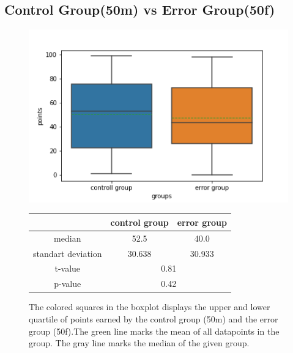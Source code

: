 \documentclass[runningheads]{llncs}
\begin{document}
\subsection{Control Group(50m) vs Error Group(50f)}
\begin{figure}
    \begin{minipage}{0.43\textwidth}        
        \includegraphics[width=\textwidth]{code/generate/all.png}
        \caption{The colored squares in the boxplot displays
        the upper and lower quartile of points earned by the control group (50m) and
        the error group (50f).The green line marks the mean of all datapoints in the group.
        The gray line marks the median  of the given group.} \label{fig8}
    \end{minipage}
\hfill
\begin{minipage}{0.43\textwidth}
\begin{tabular}[]{| c | c | c |}
        \hline
        & control group & error group \\
        \hline
        median & 52.5&40.0 \\
        \hline
        standart deviation & 30.638&30.933 \\
        \hline
        t-value & \multicolumn{2}{c|}{0.81} \\
        \hline
        p-value & \multicolumn{2}{c|}{0.42} \\
        \hline            
\end{tabular}
\end{minipage}
\end{figure}
\end{document}

